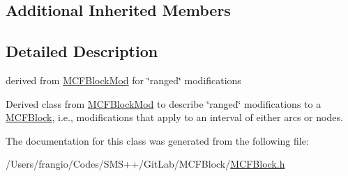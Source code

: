 \subsection*{Additional Inherited Members}


\subsection{Detailed Description}
derived from \mbox{\hyperlink{class_s_m_spp__di__unipi__it_1_1_m_c_f_block_mod}{M\+C\+F\+Block\+Mod}} for \char`\"{}ranged\char`\"{} modifications 

Derived class from \mbox{\hyperlink{class_s_m_spp__di__unipi__it_1_1_m_c_f_block_mod}{M\+C\+F\+Block\+Mod}} to describe \char`\"{}ranged\char`\"{} modifications to a \mbox{\hyperlink{class_s_m_spp__di__unipi__it_1_1_m_c_f_block}{M\+C\+F\+Block}}, i.\+e., modifications that apply to an interval of either arcs or nodes. 

The documentation for this class was generated from the following file\+:\begin{DoxyCompactItemize}
\item 
/\+Users/frangio/\+Codes/\+S\+M\+S++/\+Git\+Lab/\+M\+C\+F\+Block/\mbox{\hyperlink{_m_c_f_block_8h}{M\+C\+F\+Block.\+h}}\end{DoxyCompactItemize}
